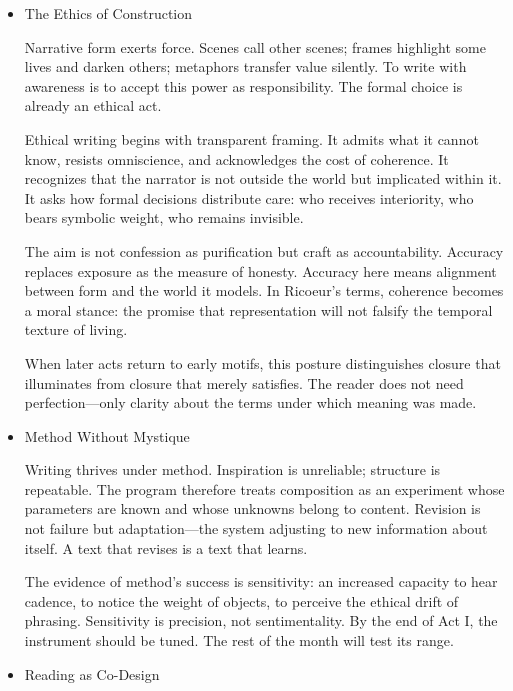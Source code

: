 \documentclass[11pt]{article}
\begin{document}
\begin{itemize}
Under controlled conditions, subtle distinctions become visible. A mirrored line changes inevitability; a single-room constraint intensifies moral visibility; the removal of dialogue uncovers the freight of silence. Over time, these observations cohere into an empirical feel for what one’s own narrative system can do.

The “fictional memoir” names this simulation honestly. It is fictional in method, autobiographical in data, and cognitive in purpose. Its truth is not correspondence but coherence.
\item The Ethics of Construction
\label{sec:orgc3f6124}

Narrative form exerts force. Scenes call other scenes; frames highlight some lives and darken others; metaphors transfer value silently. To write with awareness is to accept this power as responsibility. The formal choice is already an ethical act.

Ethical writing begins with transparent framing. It admits what it cannot know, resists omniscience, and acknowledges the cost of coherence. It recognizes that the narrator is not outside the world but implicated within it. It asks how formal decisions distribute care: who receives interiority, who bears symbolic weight, who remains invisible.

The aim is not confession as purification but craft as accountability. Accuracy replaces exposure as the measure of honesty. Accuracy here means alignment between form and the world it models. In Ricoeur’s terms, coherence becomes a moral stance: the promise that representation will not falsify the temporal texture of living.

When later acts return to early motifs, this posture distinguishes closure that illuminates from closure that merely satisfies. The reader does not need perfection—only clarity about the terms under which meaning was made.
\item Method Without Mystique
\label{sec:org4f75c4e}

Writing thrives under method. Inspiration is unreliable; structure is repeatable. The program therefore treats composition as an experiment whose parameters are known and whose unknowns belong to content. Revision is not failure but adaptation—the system adjusting to new information about itself. A text that revises is a text that learns.

The evidence of method’s success is sensitivity: an increased capacity to hear cadence, to notice the weight of objects, to perceive the ethical drift of phrasing. Sensitivity is precision, not sentimentality. By the end of Act I, the instrument should be tuned. The rest of the month will test its range.
\item Reading as Co-Design
\label{sec:org8749327}


\end{itemize}
\end{document}
